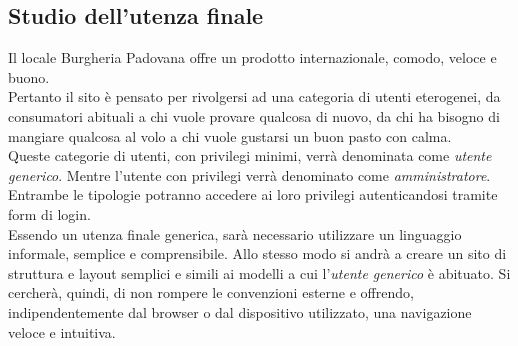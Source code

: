 \subsection{Studio dell'utenza finale}
Il locale Burgheria Padovana offre un prodotto internazionale, comodo, veloce e buono.\\
Pertanto il sito è pensato per rivolgersi ad una categoria di utenti eterogenei, da consumatori abituali a chi vuole provare qualcosa di nuovo, da chi ha bisogno di mangiare qualcosa al volo a chi vuole gustarsi un buon pasto con calma.\\
Queste categorie di utenti, con privilegi minimi, verrà denominata come \emph{utente generico}.
Mentre l'utente con privilegi verrà denominato come \emph{amministratore}.\\ 
Entrambe le tipologie potranno accedere ai loro privilegi autenticandosi tramite form di login.\\
Essendo un utenza finale generica, sarà necessario utilizzare un linguaggio informale, semplice e comprensibile.
Allo stesso modo si andrà a creare un sito di struttura e layout semplici e simili ai modelli a cui l'\emph{utente generico} è abituato.
Si cercherà, quindi, di non rompere le convenzioni esterne e offrendo, indipendentemente dal browser o dal dispositivo utilizzato, una navigazione veloce e intuitiva.\\